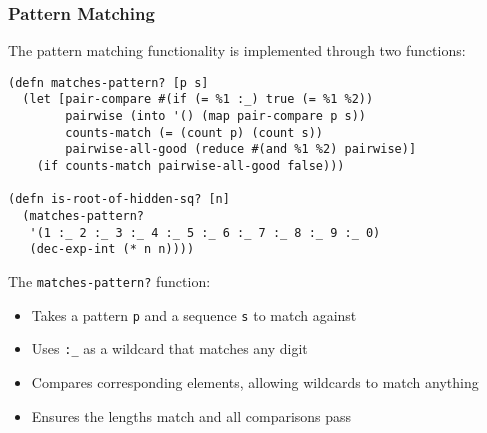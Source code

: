 \subsubsection{Pattern Matching}
The pattern matching functionality is implemented through two functions:

\begin{lstlisting}
(defn matches-pattern? [p s]
  (let [pair-compare #(if (= %1 :_) true (= %1 %2))
        pairwise (into '() (map pair-compare p s))
        counts-match (= (count p) (count s))
        pairwise-all-good (reduce #(and %1 %2) pairwise)]
    (if counts-match pairwise-all-good false)))

(defn is-root-of-hidden-sq? [n]
  (matches-pattern?
   '(1 :_ 2 :_ 3 :_ 4 :_ 5 :_ 6 :_ 7 :_ 8 :_ 9 :_ 0)
   (dec-exp-int (* n n))))
\end{lstlisting}

The \texttt{matches-pattern?} function:
\begin{itemize}
    \item Takes a pattern \texttt{p} and a sequence \texttt{s} to match against
    \item Uses \texttt{:\_} as a wildcard that matches any digit
    \item Compares corresponding elements, allowing wildcards to match anything
    \item Ensures the lengths match and all comparisons pass
\end{itemize}